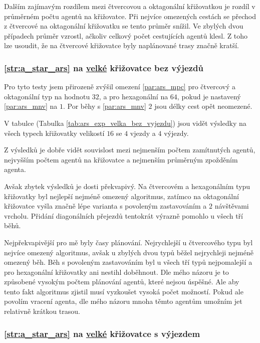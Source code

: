 Dalším zajímavým rozdílem mezi čtvercovou a oktagonální křižovatkou je rozdíl v průměrném počtu agentů na křižovatce.
Při nejvíce omezených cestách se přechod z čtvercové na oktagonální křižovatku se tento průměr snížil.
Ve zbylých dvou případech průměr vzrostl, ačkoliv celkový počet cestujících agentů klesl.
Z toho lze usoudit, že na čtvercové křižovatce byly naplánované trasy značně kratší.

\subsubsection{\ref{str:a_star_ars} na \hyperref[par:data_velka]{velké} křižovatce bez výjezdů}
\label{subsubsec:exp_ars_velka_krizovatka_bez_vyjezdu}

Pro tyto testy jsem přirozeně zvýšil omezení \ref{par:ars_mpc} pro čtvercový a oktagonální typ na hodnotu $32$,
a pro hexagonální na $64$, pokud je nastavený \ref{par:ars_mnv} na $1$.
Por běhy s \ref{par:ars_mnv} $2$ jsou délky cest opět neomezené.



V tabulce (Tabulka \ref{tab:ars_exp_velka_bez_vyjezdu}) jsou vidět výsledky na všech typech křižovatky
velikostí $16$ se $4$ vjezdy a $4$ výjezdy.

Z výsledků je dobře vidět souvislost mezi nejmenším počtem zamítnutých agentů, nejvyšším počtem agentů na křižovatce a
nejmenším průměrným zpožděním agenta.

Avšak zbytek výsledků je dosti překvapivý.
Na čtvercovém a hexagonálním typu křižovatky byl nejlepší nejméně omezený algoritmus,
zatímco na oktagonální křižovatce vyšla značně lépe varianta s povoleným zastavováním a $2$ návštěvami vrcholu.
Přidání diagonálních přejezdů tentokrát výrazně pomohlo u všech tří běhů.

Nejpřekvapivější pro mě byly časy plánování.
Nejrychlejší u čtvercového typu byl nejvíce omezený algoritmus,
avšak u zbylých dvou typů běžel nejrychleji nejméně omezený běh.
Běh s povoleným zastavováním byl u všech tří typů nejpomalejší a pro hexagonální křižovatky ani nestihl doběhnout.
Dle mého názoru je to způsobené vysokým počtem plánování agentů, které nejsou úspěšné.
Ale aby tento fakt algoritmus zjistil musí vyzkoušet vysoká počet možností.
Pokud ale povolím vracení agenta, dle mého názoru mnoha těmto agentům umožním jet relativně krátkou trasou.

\subsubsection{\ref{str:a_star_ars} na \hyperref[par:data_velka]{velké} křižovatce s výjezdem}
\label{subsubsec:exp_ars_velka_krizovatka_s_vyjezdem}


